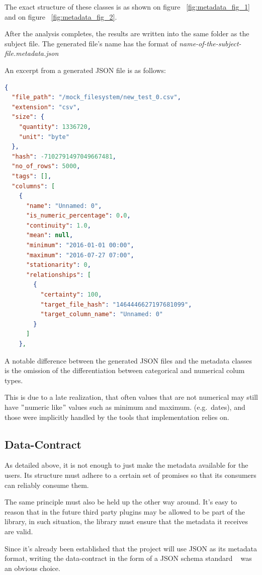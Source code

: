 The exact structure of these classes is as shown on figure ~\ref{fig:metadata_fig_1} and on figure ~\ref{fig:metadata_fig_2}.

After the analysis completes, the results are written into the same folder as the subject file.
The generated file's name has the format of \textit{name-of-the-subject-file.metadata.json}

\newline
\newline

An excerpt from a generated JSON file is as follows:
\begin{lstlisting}[language=json,firstnumber=1]
{
  "file_path": "/mock_filesystem/new_test_0.csv",
  "extension": "csv",
  "size": {
    "quantity": 1336720,
    "unit": "byte"
  },
  "hash": -7102791497049667481,
  "no_of_rows": 5000,
  "tags": [],
  "columns": [
    {
      "name": "Unnamed: 0",
      "is_numeric_percentage": 0.0,
      "continuity": 1.0,
      "mean": null,
      "minimum": "2016-01-01 00:00",
      "maximum": "2016-07-27 07:00",
      "stationarity": 0,
      "relationships": [
        {
          "certainty": 100,
          "target_file_hash": "1464446627197681099",
          "target_column_name": "Unnamed: 0"
        }
      ]
    },
\end{lstlisting}

A notable difference between the generated JSON files and the metadata classes is the
omission of the differentiation between categorical and numerical colum types.

This is due to a late realization, that often values that are not numerical may still have
\("\)numeric like\("\) values such as minimum and maximum. (e.g.\ dates), and those
were implicitly handled by the tools that implementation relies on.

\subsection{Data-Contract}
As detailed above, it is not enough to just make the metadata available for the users.
Its structure must adhere to a certain set of promises so that its consumers can reliably consume them.

The same principle must also be held up the other way around.
It's easy to reason that in the future third party plugins may be allowed to be part of
the library, in such situation, the library must ensure that the metadata it receives are valid.

Since it's already been established that the project will use JSON as its metadata format,
writing the data-contract in the form of a JSON schema standard ~\cite{jsonschema} was an obvious choice.

